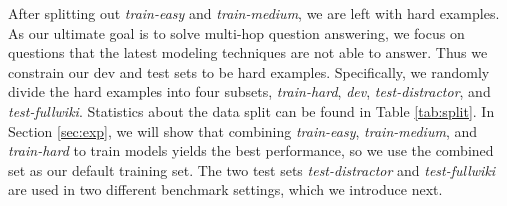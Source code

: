 After splitting out \textit{train-easy} and \textit{train-medium}, we are left with hard examples.
As our ultimate goal is to solve multi-hop question answering, we focus on questions that the latest modeling techniques are not able to answer.
Thus we constrain our dev and test sets to be hard examples.
Specifically, we randomly divide the hard examples into four subsets, \textit{train-hard}, \textit{dev}, \textit{test-distractor}, and \textit{test-fullwiki}.
Statistics about the data split can be found in Table \ref{tab:split}. In Section \ref{sec:exp}, we will show that combining \textit{train-easy}, \textit{train-medium}, and \textit{train-hard} to train models yields the best performance, so we use the combined set as our default training set. The two test sets \textit{test-distractor} and \textit{test-fullwiki} are used in two different benchmark settings, which we introduce next.








